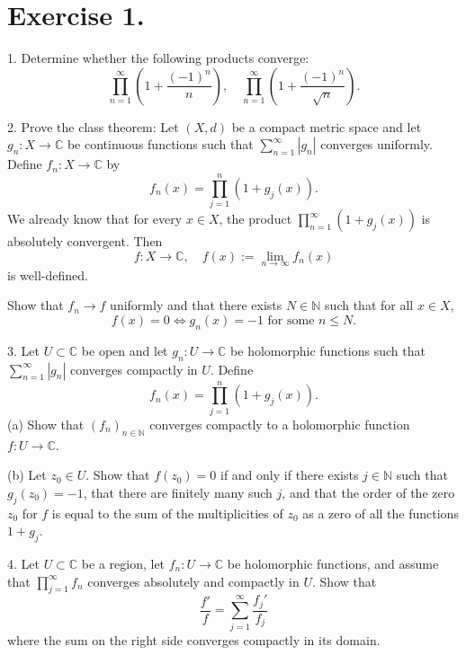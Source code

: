 
\section{Exercise 1.}

1. Determine whether the following products converge:
   \[
   \prod_{n=1}^{\infty} \left( 1 + \frac{(-1)^n}{n} \right), \quad \prod_{n=1}^{\infty} \left( 1 + \frac{(-1)^n}{\sqrt{n}} \right).
   \]

2. Prove the class theorem:  
   Let \((X, d)\) be a compact metric space and let \(g_n : X \to \mathbb{C}\) be continuous functions such that \(\sum_{n=1}^{\infty} |g_n|\) converges uniformly. Define \(f_n : X \to \mathbb{C}\) by
   \[
   f_n(x) = \prod_{j=1}^{n} (1 + g_j(x)).
   \]
   We already know that for every \(x \in X\), the product \(\prod_{n=1}^{\infty} (1 + g_j(x))\) is absolutely convergent. Then
   \[
   f : X \to \mathbb{C}, \quad f(x) := \lim_{n \to \infty} f_n(x)
   \]
   is well-defined.

   Show that \(f_n \to f\) uniformly and that there exists \(N \in \mathbb{N}\) such that for all \(x \in X\),
   \[
   f(x) = 0 \iff g_n(x) = -1 \text{ for some } n \leq N.
   \]

3. Let \(U \subset \mathbb{C}\) be open and let \(g_n : U \to \mathbb{C}\) be holomorphic functions such that \(\sum_{n=1}^{\infty} |g_n|\) converges compactly in \(U\). Define
   \[
   f_n(x) = \prod_{j=1}^{n} (1 + g_j(x)).
   \]
   (a) Show that \((f_n)_{n \in \mathbb{N}}\) converges compactly to a holomorphic function \(f : U \to \mathbb{C}\).

   (b) Let \(z_0 \in U\). Show that \(f(z_0) = 0\) if and only if there exists \(j \in \mathbb{N}\) such that \(g_j(z_0) = -1\), that there are finitely many such \(j\), and that the order of the zero \(z_0\) for \(f\) is equal to the sum of the multiplicities of \(z_0\) as a zero of all the functions \(1 + g_j\).

4. Let \(U \subset \mathbb{C}\) be a region, let \(f_n : U \to \mathbb{C}\) be holomorphic functions, and assume that \(\prod_{j=1}^{\infty} f_n\) converges absolutely and compactly in \(U\). Show that
   \[
   \frac{f'}{f} = \sum_{j=1}^{\infty} \frac{f_j'}{f_j}
   \]
   where the sum on the right side converges compactly in its domain.